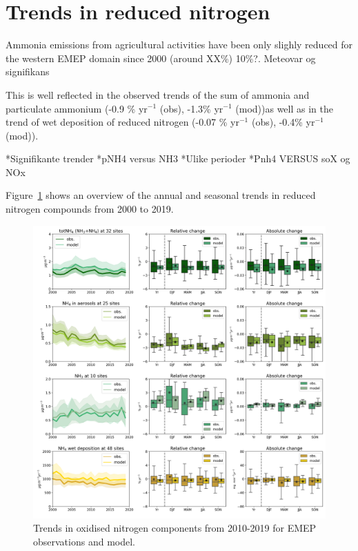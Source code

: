 \section{\label{sec:Trends_reduced nitrogen }Trends in reduced nitrogen}
Ammonia emissions from agricultural activities have been only slighly reduced for the western EMEP domain since 2000 (around XX\%) 10\%?. Meteovar og signifikans

This is well reflected in the observed trends of the sum of ammonia and particulate ammonium (-0.9 \% yr$^{-1}$ (obs), -1.3\% yr$^{-1}$ (mod))as well as in the trend of wet deposition of reduced nitrogen (-0.07 \% yr$^{-1}$ (obs), -0.4\% yr$^{-1}$ (mod)). 

*Signifikante trender
*pNH4 versus NH3
*Ulike perioder
*Pnh4 VERSUS soX og NOx

Figure~\ref{fig:Nred_trends} shows an overview of the annual and seasonal trends in reduced nitrogen compounds from 2000 to 2019.

\begin{figure}
	\centering
	\includegraphics[width=0.74\paperwidth]{FIGS_TRENDS/Nred_trends.png}
	\caption{\label{fig:Nred_trends}Trends in oxidised nitrogen components from 2010-2019 for EMEP observations and model.}
\end{figure}



